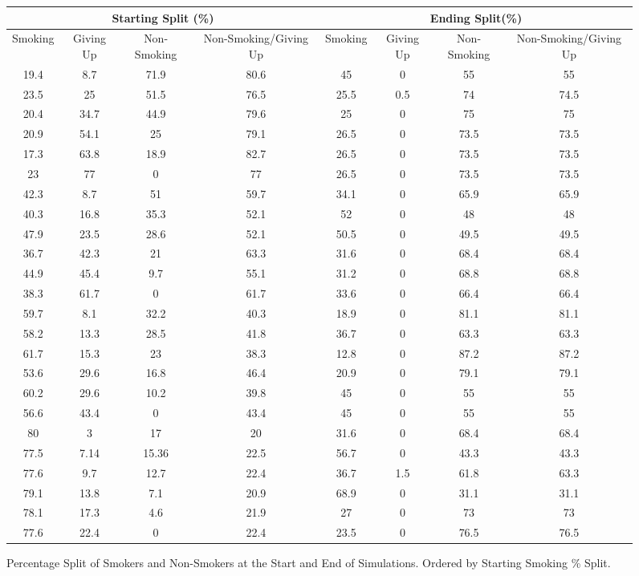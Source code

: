 \documentclass[]{report}
\begin{document}
\begin{landscape}
\begin{figure}
\begin{center}
\begin{tabular}{|c|c|c|c|c|c|c|c|}
\hline
\multicolumn{4}{|c|}{\textbf{Starting Split (\%)}} & \multicolumn{4}{|c|}{\textbf{Ending Split(\%)}}\\
\hline
Smoking & Giving Up & Non-Smoking & Non-Smoking/Giving Up & Smoking & Giving Up & Non-Smoking & Non-Smoking/Giving Up\\
\hline
19.4 & 	8.7	 &	71.9 &	80.6 &	45		&0		&55	 &	55		\\
23.5 & 	25	 &	51.5 &	76.5 &	25.5	&0.5	&74	 &	74.5		\\
20.4 &	34.7 &	44.9 &	79.6 &	25		&0		&75	 &	75		\\
20.9 &	54.1 &	25	 &	79.1 &	26.5	&0		&73.5 &	73.5	\\
17.3 &	63.8 &	18.9 &	82.7 &	26.5	&0		&73.5 &	73.5	\\
23	 &	77	 &	0	 &	77	 &	26.5	&0		&73.5 &	73.5	\\
\hline
42.3 &	8.7	 &	51	 &	59.7 &	34.1	&0		&65.9 &	65.9	\\
40.3 &	16.8 &	35.3 &	52.1 &	52		&0		&48	 &	48		\\
47.9 &	23.5 &	28.6 &	52.1 &	50.5	&0		&49.5 &	49.5	\\
36.7 &	42.3 &	21	 &	63.3 &	31.6	&0		&68.4 &	68.4	\\
44.9 &	45.4 &	9.7	 &	55.1 &	31.2	&0		&68.8 &	68.8	\\
38.3 &	61.7 &	0	 &	61.7 &	33.6	&0		&66.4 &	66.4	\\
\hline
59.7 &	8.1	 &	32.2 &	40.3 &	18.9	&0		&81.1 &	81.1	\\
58.2 &	13.3 &	28.5 &	41.8 &	36.7	&0		&63.3 &	63.3	\\
61.7 &	15.3 &	23	 &	38.3 &	12.8	&0		&87.2 &	87.2	\\
53.6 &	29.6 &	16.8 &	46.4 &	20.9	&0		&79.1 &	79.1	\\
60.2 &	29.6 &	10.2 &	39.8 &	45		&0		&55	 &	55		\\
56.6 &	43.4 &	0	 &	43.4 &	45		&0		&55	 &	55		\\
\hline
80	 &	3	 &	17	 &	20	 &	31.6	&0		&68.4 &	68.4	\\
77.5 &	7.14 &	15.36 &	22.5 &	56.7	&0		&43.3 &	43.3	\\
77.6 &	9.7	 &	12.7 &	22.4 &	36.7	&1.5	&61.8 &	63.3	\\
79.1 &	13.8 &	7.1	 &	20.9 &	68.9	&0		&31.1 &	31.1	\\
78.1 &	17.3 &	4.6	 &	21.9 &	27		&0		&73	 &	73		\\
77.6 &	22.4 &	0	 &	22.4 &	23.5	&0		&76.5 &	76.5	\\

\hline
\end{tabular}
\end{center}
\caption{Percentage Split of Smokers and Non-Smokers at the Start and End of Simulations. Ordered by Starting Smoking \% Split.}
\label{tab:stats}
\end{figure}
\end{landscape}
\end{document}
